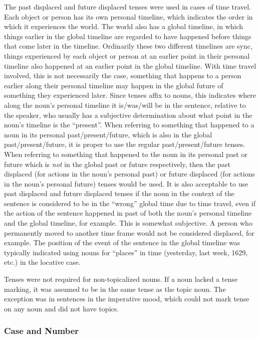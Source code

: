 \documentclass{article}
\begin{document}
The past displaced and future displaced tenses were used in cases of time travel.  Each object or person has its own personal timeline, which indicates the order in which it experiences the world.  The world also has a global timeline, in which things earlier in the global timeline are regarded to have happened before things that come later in the timeline.  Ordinarily these two different timelines are sync, things experienced by each object or person at an earlier point in their personal timeline also happened at an earlier point in the global timeline.  With time travel involved, this is not necessarily the case, something that happens to a person earlier along their personal timeline may happen in the global future of something they experienced later.  Since tenses affix to nouns, this indicates where along the noun's personal timeline it is/was/will be in the sentence, relative to the speaker, who usually has a subjective determination about what point in the noun's timeline is the ``present''.  When referring to something that happened to a noun in its personal past/present/future, which is also in the global past/present/future, it is proper to use the regular past/present/future tenses.  When referring to something that happened to the noun in its personal past or future which is \emph{not} in the global past or future respectively, then the past displaced (for actions in the noun's personal past) or future displaced (for actions in the noun's personal future) tenses would be used.  It is also acceptable to use past displaced and future displaced tenses if the noun in the context of the sentence is considered to be in the ``wrong'' global time due to time travel, even if the action of the sentence happened in past of both the noun's personal timeline and the global timeline, for example.  This is somewhat subjective.  A person who permanently moved to another time frame would not be considered displaced, for example.  The position of the event of the sentence in the global timeline was typically indicated using nouns for ``places'' in time (yesterday, last week, 1629, etc.) in the locative case.

Tenses were not required for non-topicalized nouns.  If a noun lacked a tense marking, it was assumed to be in the same tense as the topic noun.  The exception was in sentences in the imperative mood, which could not mark tense on any noun and did not have topics.

\subsubsection{Case and Number}
\end{document}
